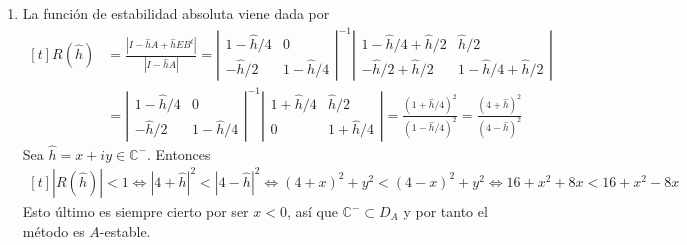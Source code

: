 \documentclass[11pt]{report}
\newcommand{\C}{\mathbb C}
\begin{document}
\begin{enumerate}
\[\begin{array}{c}
        1 \\
        1
    \end{array}\right) = \frac{1}{2},\]
    así que el método es de orden $2$. Seguimos:
    \[B^tC^2E = \left(\begin{array}{cc}
        1/2 & 1/2
    \end{array}\right)\left(\begin{array}{cc}
        1/4 & 0 \\
        0 & 3/4
    \end{array}\right)\left(\begin{array}{cc}
        1/4 & 0 \\
        0 & 3/4
    \end{array}\right)\left(\begin{array}{c}
        1 \\
        1
    \end{array}\right) = \left(\begin{array}{cc}
        1/8 & 3/8
    \end{array}\right)\left(\begin{array}{c}
        1/4 \\
        3/4
    \end{array}\right) = \frac{5}{16} \neq \frac{1}{3} \]
    Esto indica que el método no es de orden $3$, así que es de orden exactamente $2$.
    \item La función de estabilidad absoluta viene dada por 
    \[\begin{aligned}[t] R(\hat{h}) &= \frac{|I-\hat{h}A+\hat{h}EB^t|}{|I-\hat{h}A|} = \left|\begin{array}{cc}
    1-\hat{h}/4 & 0 \\
    -\hat{h}/2 & 1-\hat{h}/4
    \end{array}\right|^{-1}\left|\begin{array}{cc}
        1-\hat{h}/4+\hat{h}/2 & \hat{h}/2 \\
        -\hat{h}/2+\hat{h}/2 & 1-\hat{h}/4+\hat{h}/2
    \end{array}\right| \\
    &=\left|\begin{array}{cc}
        1-\hat{h}/4 & 0 \\
        -\hat{h}/2 & 1-\hat{h}/4
        \end{array}\right|^{-1}\left|\begin{array}{cc}
            1+\hat{h}/4 & \hat{h}/2 \\
           0 & 1+\hat{h}/4
        \end{array}\right| = \frac{(1+\hat{h}/4)^2}{(1-\hat{h}/4)^2} = \frac{(4+\hat{h})^2}{(4-\hat{h})^2}
    \end{aligned}\]
    Sea $\hat{h}=x+iy \in \C^-$. Entonces
    \[\begin{aligned}[t]
        |R(\hat{h})| < 1 \iff |4+\hat{h}|^2 < |4-\hat{h}|^2 \iff (4+x)^2+y^2 < (4-x)^2+y^2 \iff 16+x^2+8x < 16+x^2-8x
    \end{aligned}\]
    Esto último es siempre cierto por ser $x<0$, así que $\C^- \subset D_A$ y por tanto el método es $A$-estable.
\end{enumerate}
\end{document}
